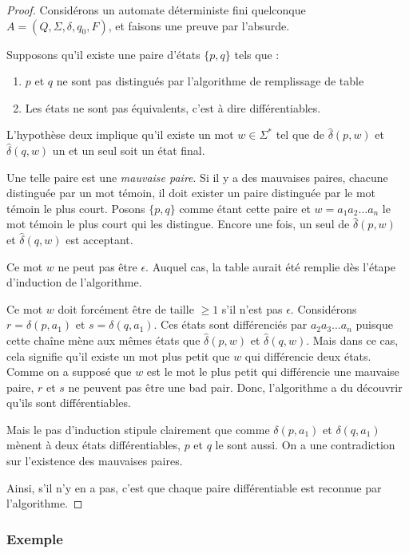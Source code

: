 	 \begin{proof}
	 	Considérons un automate déterministe fini quelconque $A = (Q, \Sigma, \delta, q_0, F)$, et faisons une preuve par l'absurde.
	 	
	 	Supposons qu'il existe une paire d'états $\{p,q\}$ tels que :
	 	\begin{enumerate}
	 		\item $p$ et $q$ ne sont pas distingués par l'algorithme de remplissage de table
	 		\item Les états ne sont pas équivalents, c'est à dire différentiables.
	 	\end{enumerate}
	 	
	 	L'hypothèse deux implique qu'il existe un mot $w \in \Sigma^*$ tel que de $\hat{\delta}(p,w)$ et $\hat{\delta}(q,w)$ un et un seul soit un état final.
	 	
	 	Une telle paire est une \emph{mauvaise paire}. Si il y a des mauvaises paires, chacune distinguée par un mot témoin, il doit exister un paire distinguée par le mot témoin le plus court. Posons $\{p,q\}$ comme étant cette paire et $w=a_1a_2\dots a_n$ le mot témoin le plus court qui les distingue. Encore une fois, un seul de $\hat{\delta}(p,w)$ et $\hat{\delta}(q,w)$ est acceptant.
	 	
	 	Ce mot $w$ ne peut pas être $\epsilon$. Auquel cas, la table aurait été remplie dès l'étape d'induction de l'algorithme.
	 	
	 	Ce mot $w$ doit forcément être de taille $\ge 1$ s'il n'est pas $\epsilon$. Considérons $r = \delta(p,a_1)$ et $s=\delta(q,a_1)$. Ces états sont différenciés par $a_2a_3\dots a_n$ puisque cette chaîne mène aux mêmes états que $\hat{\delta}(p,w)$ et $\hat{\delta}(q,w)$. Mais dans ce cas, cela signifie qu'il existe un mot plus petit que $w$ qui différencie deux états. Comme on a supposé que $w$ est le mot le plus petit qui différencie une mauvaise paire, $r$ et $s$ ne peuvent pas être une bad pair. Donc, l'algorithme a du découvrir qu'ils sont différentiables.
	 	
	 	Mais le pas d'induction stipule clairement que comme $\delta(p, a_1)$ et $\delta(q, a_1)$ mènent à deux états différentiables, $p$ et $q$ le sont aussi. On a une contradiction sur l'existence des mauvaises paires.
	 	
	 	Ainsi, s'il n'y en a pas, c'est que chaque paire différentiable est reconnue par l'algorithme.
	 \end{proof}
	 
	 
	 \subsubsection{Exemple}
	 
